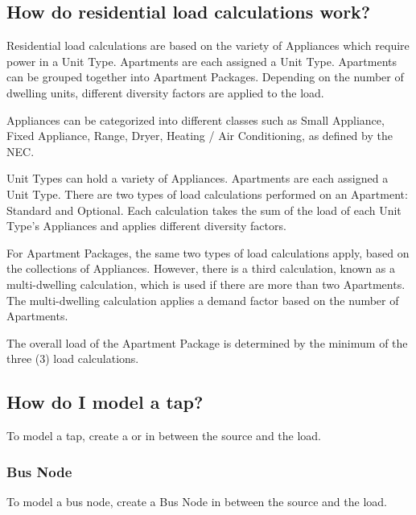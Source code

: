 \documentclass[letterpaper,10pt,english]{sphinxmanual}
\begin{document}
\subsection{How do residential load calculations work?}
\label{\detokenize{docs/faq:how-do-residential-load-calculations-work}}
Residential load calculations are based on the variety of Appliances which require power in a Unit Type.  Apartments are each assigned a Unit Type.  Apartments can be grouped together into Apartment Packages.  Depending on the number of dwelling units, different diversity factors are applied to the load.

Appliances can be categorized into different classes such as Small Appliance, Fixed Appliance, Range, Dryer, Heating / Air Conditioning, as defined by the NEC.

Unit Types can hold a variety of Appliances.  Apartments are each assigned a Unit Type.  There are two types of load calculations performed on an Apartment: Standard and Optional.  Each calculation takes the sum of the load of each Unit Type’s Appliances and applies different diversity factors.

For Apartment Packages, the same two types of load calculations apply, based on the collections of Appliances.  However, there is a third calculation, known as a multi-dwelling calculation, which is used if there are more than two Apartments.  The multi-dwelling calculation applies a demand factor based on the number of Apartments.

The overall load of the Apartment Package is determined by the minimum of the three (3) load calculations.


\subsection{How do I model a tap?}
\label{\detokenize{docs/faq:how-do-i-model-a-tap}}
To model a tap, create a {\hyperref[\detokenize{docs/faq:tap-node}]{}} or {\hyperref[\detokenize{docs/faq:bus-node}]{}} in between the source and the load.


\subsubsection{Bus Node}
\label{\detokenize{docs/faq:bus-node}}\label{\detokenize{docs/faq:id1}}
To model a bus node, create a Bus Node in between the source and the load.
\end{document}

